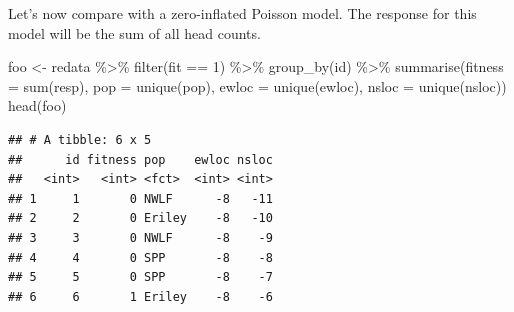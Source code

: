 \documentclass[
  ignorenonframetext,
]{beamer}
\newenvironment{Shaded}{\begin{snugshade}}{\end{snugshade}}
\newcommand{\AttributeTok}[1]{\textcolor[rgb]{0.77,0.63,0.00}{#1}}
\newcommand{\DecValTok}[1]{\textcolor[rgb]{0.00,0.00,0.81}{#1}}
\newcommand{\FunctionTok}[1]{\textcolor[rgb]{0.00,0.00,0.00}{#1}}
\newcommand{\NormalTok}[1]{#1}
\newcommand{\OtherTok}[1]{\textcolor[rgb]{0.56,0.35,0.01}{#1}}
\newcommand{\SpecialCharTok}[1]{\textcolor[rgb]{0.00,0.00,0.00}{#1}}
\begin{document}
\begin{frame}[fragile]{}
\protect\hypertarget{section-43}{}
Let's now compare with a zero-inflated Poisson model. The response for
this model will be the sum of all head counts.

\vspace{12pt}
\tiny

\begin{Shaded}
\begin{Highlighting}[]
\NormalTok{foo }\OtherTok{\textless{}{-}}\NormalTok{ redata }\SpecialCharTok{\%\textgreater{}\%} \FunctionTok{filter}\NormalTok{(fit }\SpecialCharTok{==} \DecValTok{1}\NormalTok{) }\SpecialCharTok{\%\textgreater{}\%} \FunctionTok{group\_by}\NormalTok{(id) }\SpecialCharTok{\%\textgreater{}\%} 
  \FunctionTok{summarise}\NormalTok{(}\AttributeTok{fitness =} \FunctionTok{sum}\NormalTok{(resp), }\AttributeTok{pop =} \FunctionTok{unique}\NormalTok{(pop), }
            \AttributeTok{ewloc =} \FunctionTok{unique}\NormalTok{(ewloc), }\AttributeTok{nsloc =} \FunctionTok{unique}\NormalTok{(nsloc))}
\FunctionTok{head}\NormalTok{(foo)}
\end{Highlighting}
\end{Shaded}

\begin{verbatim}
## # A tibble: 6 x 5
##      id fitness pop    ewloc nsloc
##   <int>   <int> <fct>  <int> <int>
## 1     1       0 NWLF      -8   -11
## 2     2       0 Eriley    -8   -10
## 3     3       0 NWLF      -8    -9
## 4     4       0 SPP       -8    -8
## 5     5       0 SPP       -8    -7
## 6     6       1 Eriley    -8    -6
\end{verbatim}
\end{frame}
\end{document}
